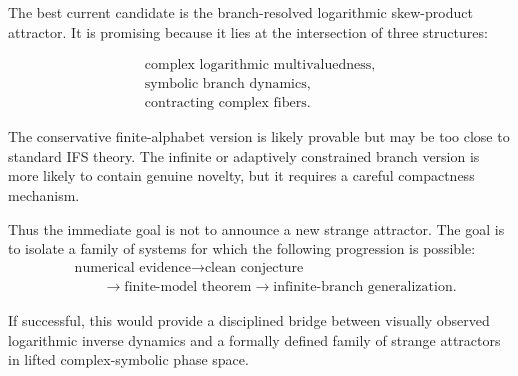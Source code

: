 	The best current candidate is the branch-resolved logarithmic skew-product attractor. It is promising because it lies at the intersection of three structures:
	
	\[
	\begin{gathered}
	\text{complex logarithmic multivaluedness},\\
	\text{symbolic branch dynamics},\\
	\text{contracting complex fibers}.
	\end{gathered}
	\]
	
	The conservative finite-alphabet version is likely provable but may be too close to standard IFS theory. The infinite or adaptively constrained branch version is more likely to contain genuine novelty, but it requires a careful compactness mechanism.
	
	Thus the immediate goal is not to announce a new strange attractor. The goal is to isolate a family of systems for which the following progression is possible:
	\[
	\begin{aligned}
	&\text{numerical evidence}
	\longrightarrow
	\text{clean conjecture}\\
	&\qquad\longrightarrow
	\text{finite-model theorem}
	\longrightarrow
	\text{infinite-branch generalization}.
	\end{aligned}
	\]
	
	If successful, this would provide a disciplined bridge between visually observed logarithmic inverse dynamics and a formally defined family of strange attractors in lifted complex-symbolic phase space.

\endgroup
